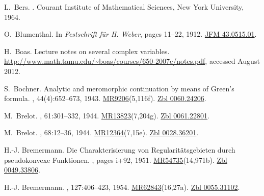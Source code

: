 \documentclass[11pt,a4paper, final, twoside]{article}
\numberwithin{equation}{section}
\begin{document}
\begin{appendices}
\begin{thebibliography}{100}
L.~Bers.
.
\newblock Courant Institute of Mathematical Sciences, New York University,
  1964.

O.~Blumenthal.
\newblock In {\em {Festschrift f\"ur H. Weber}}, pages 11--22, 1912.
\newblock \href{http://zbmath.org/?q=an:43.0515.01}{JFM 43.0515.01}.

H.~Boas.
\newblock Lecture notes on several complex variables.
\newblock \url{http://www.math.tamu.edu/~boas/courses/650-2007c/notes.pdf},
  accessed August 2012.

S.~Bochner.
\newblock Analytic and meromorphic continuation by means of {G}reen's formula.
, 44(4):652--673, 1943.
\newblock \href{http://www.ams.org/mathscinet-getitem?mr=9206}{MR9206}(5,116f).
  \href{http://zbmath.org/?q=an:0060.24206}{Zbl 0060.24206}.

M.~Brelot.
, 61:301--332, 1944.
\newblock
  \href{http://www.ams.org/mathscinet-getitem?mr=13823}{MR13823}(7,204g).
  \href{http://zbmath.org/?q=an:0061.22801}{Zbl 0061.22801}.

M.~Brelot.
,
  68:12--36, 1944.
\newblock
  \href{http://www.ams.org/mathscinet-getitem?mr=12364}{MR12364}(7,15e).
  \href{http://zbmath.org/?q=an:0028.36201}{Zbl 0028.36201}.

H.-J. Bremermann.
\newblock Die {C}harakterisierung von {R}egularit\"atsgebieten durch
  pseudokonvexe {F}unktionen.
, pages i+92, 1951.
\newblock
  \href{http://www.ams.org/mathscinet-getitem?mr=54735}{MR54735}(14,971b).
  \href{http://zbmath.org/?q=an:0049.33806}{Zbl 0049.33806}.

H.-J. Bremermann.
, 127:406--423, 1954.
\newblock
  \href{http://www.ams.org/mathscinet-getitem?mr=62843}{MR62843}(16,27a).
  \href{http://zbmath.org/?q=an:0055.31102}{Zbl 0055.31102}.


\end{thebibliography}
\end{appendices}
\end{document}
